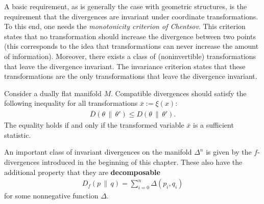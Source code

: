    A basic requirement, as is generally the case with geometric structures, is the requirement that the divergences are invariant under coordinate transformations. To this end, one needs the \textit{monotonicity criterion of Chentsov}. This criterion states that no transformation should increase the divergence between two points (this corresponds to the idea that transformations can never increase the amount of information). Moreover, there exists a class of (noninvertible) transformations that leave the divergence invariant.
    The invariance criterion states that these transformations are the only transformations that leave the divergence invariant.
    \begin{axiom}
        Consider a dually flat manifold $M$. Compatible divergences should satisfy the following inequality for all transformations $\overline{x}:=\xi(x)$:
        \begin{gather}
            \overline{D}(\theta\,\|\,\theta')\leq D(\theta\,\|\,\theta').
        \end{gather}
        The equality holds if and only if the transformed variable $\overline{x}$ is a sufficient statistic.
    \end{axiom}

    \begin{example}[$f$-divergences]
        An important class of invariant divergences on the manifold $\Delta^n$ is given by the $f$-divergences introduced in the beginning of this chapter. These also have the additional property that they are \textbf{decomposable}
        \begin{gather}
            D_f(p\,\|\,q) = \sum_{i=0}^n\Delta(p_i, q_i)
        \end{gather}
        for some nonnegative function $\Delta$.
    \end{example}

